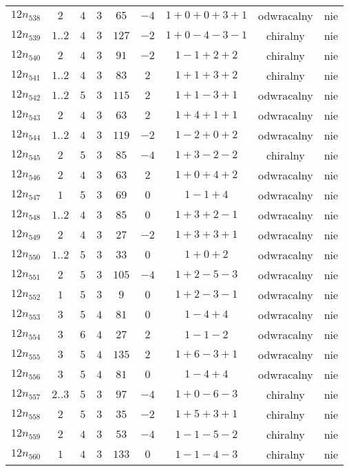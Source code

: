 \begin{longtable}{ccccccccc}
$12n_{538}$ & $2$ & $4$ & $3$ & $65$ & $-4$ & $1+0+0+3+1$ & odwracalny & nie \\
$12n_{539}$ & $1..2$ & $4$ & $3$ & $127$ & $-2$ & $1+0-4-3-1$ & chiralny & nie \\
$12n_{540}$ & $2$ & $4$ & $3$ & $91$ & $-2$ & $1-1+2+2$ & chiralny & nie \\
$12n_{541}$ & $1..2$ & $4$ & $3$ & $83$ & $2$ & $1+1+3+2$ & chiralny & nie \\
$12n_{542}$ & $1..2$ & $5$ & $3$ & $115$ & $2$ & $1+1-3+1$ & odwracalny & nie \\
$12n_{543}$ & $2$ & $4$ & $3$ & $63$ & $2$ & $1+4+1+1$ & odwracalny & nie \\
$12n_{544}$ & $1..2$ & $4$ & $3$ & $119$ & $-2$ & $1-2+0+2$ & odwracalny & nie \\
$12n_{545}$ & $2$ & $5$ & $3$ & $85$ & $-4$ & $1+3-2-2$ & chiralny & nie \\
$12n_{546}$ & $2$ & $4$ & $3$ & $63$ & $2$ & $1+0+4+2$ & odwracalny & nie \\
$12n_{547}$ & $1$ & $5$ & $3$ & $69$ & $0$ & $1-1+4$ & odwracalny & nie \\
$12n_{548}$ & $1..2$ & $4$ & $3$ & $85$ & $0$ & $1+3+2-1$ & odwracalny & nie \\
$12n_{549}$ & $2$ & $4$ & $3$ & $27$ & $-2$ & $1+3+3+1$ & odwracalny & nie \\
$12n_{550}$ & $1..2$ & $5$ & $3$ & $33$ & $0$ & $1+0+2$ & odwracalny & nie \\
$12n_{551}$ & $2$ & $5$ & $3$ & $105$ & $-4$ & $1+2-5-3$ & odwracalny & nie \\
$12n_{552}$ & $1$ & $5$ & $3$ & $9$ & $0$ & $1+2-3-1$ & odwracalny & nie \\
$12n_{553}$ & $3$ & $5$ & $4$ & $81$ & $0$ & $1-4+4$ & odwracalny & nie \\
$12n_{554}$ & $3$ & $6$ & $4$ & $27$ & $2$ & $1-1-2$ & odwracalny & nie \\
$12n_{555}$ & $3$ & $5$ & $4$ & $135$ & $2$ & $1+6-3+1$ & odwracalny & nie \\
$12n_{556}$ & $3$ & $5$ & $4$ & $81$ & $0$ & $1-4+4$ & odwracalny & nie \\
$12n_{557}$ & $2..3$ & $5$ & $3$ & $97$ & $-4$ & $1+0-6-3$ & chiralny & nie \\
$12n_{558}$ & $2$ & $5$ & $3$ & $35$ & $-2$ & $1+5+3+1$ & chiralny & nie \\
$12n_{559}$ & $2$ & $4$ & $3$ & $53$ & $-4$ & $1-1-5-2$ & chiralny & nie \\
$12n_{560}$ & $1$ & $4$ & $3$ & $133$ & $0$ & $1-1-4-3$ & chiralny & nie \\

\end{longtable}
